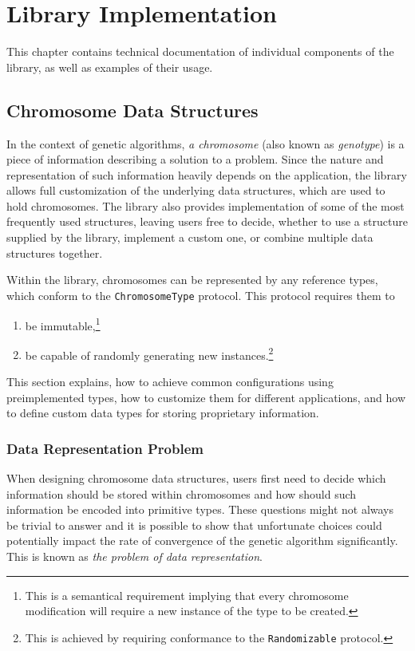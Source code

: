 \chapter{Library Implementation}
This chapter contains technical documentation of individual components of the library, as well as examples of their usage.

\section{Chromosome Data Structures}
In the context of genetic algorithms, \textit{a chromosome} (also known as \textit{genotype}) is a piece of information describing a solution to a problem. Since the nature and representation of such information heavily depends on the application, the library allows full customization of the underlying data structures, which are used to hold chromosomes. The library also provides implementation of some of the most frequently used structures, leaving users free to decide, whether to use a structure supplied by the library, implement a custom one, or combine multiple data structures together.

Within the library, chromosomes can be represented by any reference types, which conform to the \texttt{ChromosomeType} protocol. This protocol requires them to
~
\begin{enumerate}
	\item be immutable,\footnote{This is a semantical requirement implying that every chromosome modification will require a new instance of the type to be created.}
	\item be capable of randomly generating new instances.\footnote{This is achieved by requiring conformance to the \texttt{Randomizable} protocol.}
\end{enumerate}

This section explains, how to achieve common configurations using preimplemented types, how to customize them for different applications, and how to define custom data types for storing proprietary information.

\subsection{Data Representation Problem}
When designing chromosome data structures, users first need to decide which information should be stored within chromosomes and how should such information be encoded into primitive types. These questions might not always be trivial to answer and it is possible to show that 
unfortunate choices could potentially impact the rate of convergence of the genetic algorithm significantly. This is known as \textit{the problem of data representation}.

